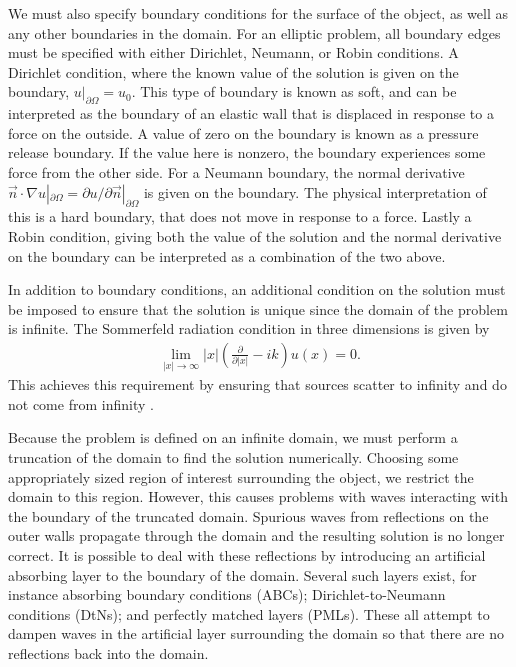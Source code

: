 We must also specify boundary conditions for the surface of the object, as well as any other boundaries in the domain.
For an elliptic problem, all boundary edges must be specified with either Dirichlet, Neumann, or Robin conditions.
A Dirichlet condition, where the known value of the solution is given on the boundary, $u|_{\partial\Omega}=u_0$.
This type of boundary is known as soft, and can be interpreted as the boundary of an elastic wall that is displaced in response to a force on the outside.
A value of zero on the boundary is known as a pressure release boundary.
If the value here is nonzero, the boundary experiences some force from the other side.
For a Neumann boundary, the normal derivative $\vec{n}\cdot \nabla u |_{\partial \Omega} = \partial u / \partial \vec{n} |_{\partial \Omega}$ is given on the boundary.
The physical interpretation of this is a hard boundary, that does not move in response to a force.
Lastly a Robin condition, giving both the value of the solution and the normal derivative on the boundary can be interpreted as a combination of the two above.



In addition to boundary conditions, an additional condition on the solution must be imposed to ensure that the solution is unique since the domain of the problem is infinite.
The Sommerfeld radiation condition in three dimensions is given by
\begin{align}
	\lim_{|x|\rightarrow \infty} |x| \left( \frac{\partial}{\partial |x|} - ik \right) u(x) = 0. \label{eqn:sommerfeld}
\end{align}
This achieves this requirement by ensuring that sources scatter to infinity and do not come from infinity \cite{sommerfeld}.

Because the problem is defined on an infinite domain, we must perform a truncation of the domain to find the solution numerically.
Choosing some appropriately sized region of interest surrounding the object, we restrict the domain to this region.
However, this causes problems with waves interacting with the boundary of the truncated domain.
Spurious waves from reflections on the outer walls propagate through the domain and the resulting solution is no longer correct.
It is possible to deal with these reflections by introducing an artificial absorbing layer to the boundary of the domain.
Several such layers exist, for instance absorbing boundary conditions (ABCs); Dirichlet-to-Neumann conditions (DtNs); and perfectly matched layers (PMLs).
These all attempt to dampen waves in the artificial layer surrounding the domain so that there are no reflections back into the domain.



